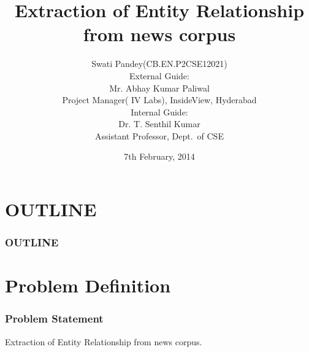 \documentclass[10pt]{beamer}
\begin{document}
\title {\bfseries{\sc Extraction of Entity Relationship from news corpus}}
\author[Swati Pandey (CB.EN.P2CSE12021)]{\small {Swati Pandey(CB.EN.P2CSE12021)\\External Guide:\\Mr. Abhay Kumar Paliwal\\Project Manager( IV Labs), InsideView, Hyderabad\\Internal Guide:\\Dr. T. Senthil Kumar\\Assistant Professor, Dept.~of CSE}}
\date{\small 7th February, 2014} 
\begin{frame}
\titlepage
\end{frame}
\section*{OUTLINE}
\begin{frame}
\frametitle{OUTLINE}  
\tableofcontents
\end{frame}

\section{Problem Definition}
\begin{frame}
\frametitle{Problem Statement}
Extraction of Entity Relationship from news corpus.
\end{frame}
\end{document}
